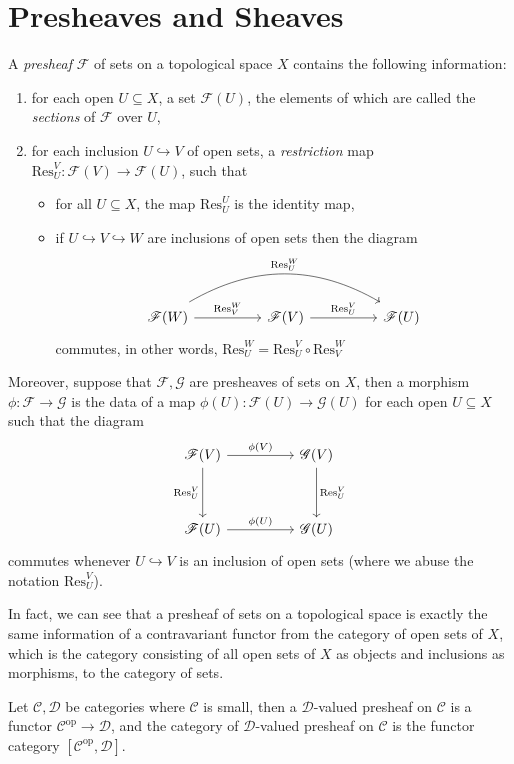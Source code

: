 \documentclass[11pt]{book}
\begin{document}
\section{Presheaves and Sheaves}
\begin{definition}A \textit{presheaf} $\mathscr{F}$ of sets on a topological space $X$ contains the following information:
\begin{enumerate}[label=(\roman*)]
	\item for each open $U\subseteq X$, a set $\mathscr{F}(U)$, the elements of which are called the \textit{sections} of $\mathscr{F}$ over $U$,
	\item for each inclusion $U\hookrightarrow V$ of open sets, a \textit{restriction} map $\mathrm{Res}^V_U:\mathscr{F}(V)\rightarrow\mathscr{F}(U)$, such that
	\begin{itemize}
		\item for all $U\subseteq X$, the map $\mathrm{Res}^U_U$ is the identity map,
		\item if $U\hookrightarrow V \hookrightarrow W$ are inclusions of open sets then the diagram
		\[
		\begin{tikzcd}[sep=huge]
			\mathscr{F}(W) \arrow[r,"\mathrm{Res}^W_V"] \arrow[rr, "\mathrm{Res}^W_U", bend left, shift left=1] & \mathscr{F}(V) \arrow[r,"\mathrm{Res}^V_U"] & \mathscr{F}(U)
		\end{tikzcd}
		\]
		commutes, in other words, $\mathrm{Res}^W_U=\mathrm{Res}^V_U\circ \mathrm{Res}^W_V$
	\end{itemize}
\end{enumerate}
Moreover, suppose that $\mathscr{F},\mathscr{G}$ are presheaves of sets on $X$, then a morphism $\phi:\mathscr{F}\rightarrow\mathscr{G}$ is the data of a map $\phi(U):\mathscr{F}(U)\rightarrow\mathscr{G}(U)$ for each open $U\subseteq X$ such that the diagram
\[
\begin{tikzcd}[sep = huge]
\mathscr{F}(V) \arrow[r, "\phi(V)"] \arrow[d, "\mathrm{Res}^V_U"'] & \mathscr{G}(V) \arrow[d, "\mathrm{Res}^V_U"] \\
\mathscr{F}(U) \arrow[r, "\phi(U)"]                 & \mathscr{G}(U)               
\end{tikzcd}\]
commutes whenever $U\hookrightarrow V$ is an inclusion of open sets (where we abuse the notation $\mathrm{Res}^V_U$).
\end{definition}
In fact, we can see that a presheaf of sets on a topological space is exactly the same information of a contravariant functor from the category of open sets of $X$, which is the category consisting of all open sets of $X$ as objects and inclusions as morphisms, to the category of sets. 
\begin{definitionbox}
Let $\mathcal{C},\mathcal{D}$ be categories where $\mathcal{C}$ is small, then a $\mathcal{D}$-valued presheaf on $\mathcal{C}$ is a functor $\mathcal{C}^{\mathrm{op}}\rightarrow\mathcal{D}$, and the category of $\mathcal{D}$-valued presheaf on $\mathcal{C}$ is the functor category $[\mathcal{C}^{\mathrm{op}},\mathcal{D}]$.
\end{definitionbox}
\end{document}
